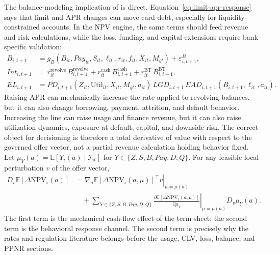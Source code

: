 \documentclass[11pt]{article}
\newcommand{\E}{\mathbb{E}}
\newcommand{\NPV}{\mathrm{NPV}}
\newcommand{\1}{\mathbf{1}}
\begin{document}
The balance-modeling implication of \citet{gross2001liquidity} is direct.
Equation~\eqref{eq:limit-apr-response} says that limit and APR changes can move
card debt, especially for liquidity-constrained accounts. In the NPV engine,
the same terms should feed revenue and risk calculations, while the loss,
funding, and capital extensions require bank-specific validation:
\begin{align}
  B_{i,t+1}
    &=
      g_B(B_{it},Pay_{it},S_{it},\ell_{it},r_{it},f_{it},
          X_{it},M_{gt}) + \varepsilon^B_{i,t+1},
      \label{eq:terms-balance}\\
  Int_{i,t+1}
    &=
      r^{\mathrm{revolve}}_{it}\,
      B^{\mathrm{revolve}}_{i,t+1}
      + r^{\mathrm{cash}}_{it}\,
      B^{\mathrm{cash}}_{i,t+1}
      + r^{\mathrm{BT}}_{it}\,
      B^{\mathrm{BT}}_{i,t+1},
      \label{eq:terms-interest}\\
  EL_{i,t+1}
    &=
      PD_{i,t+1}(Z_{it},\mathrm{Util}_{it},X_{it},M_{gt},a_{it})\,
      LGD_{i,t+1}\,
      EAD_{i,t+1}(B_{i,t+1},\ell_{it},a_{it}).
      \label{eq:terms-loss}
\end{align}
Raising APR can mechanically increase the rate applied to revolving balances,
but it can also change borrowing, payment, attrition, and default behavior.
Increasing the line can raise usage and finance revenue, but it can also raise
utilization dynamics, exposure at default, capital, and downside risk. The
correct object for decisioning is therefore a total derivative of value with
respect to the governed offer vector, not a partial revenue calculation holding
behavior fixed. Let
$\mu_Y(a)=\E[Y_i(a)\mid\mathcal{I}_{it}]$ for
$Y\in\{Z,S,B,Pay,D,Q\}$. For any feasible local perturbation $v$ of the offer
vector,
\begin{align}
  D_v\E[\Delta \NPV_i(a)]
  &=
  \left.
  \nabla_a \E[\Delta \NPV_i(a,\mu)]^\top v
  \right|_{\mu=\mu(a)}
  \nonumber\\
  &\quad
  +
  \sum_{Y\in\{Z,S,B,Pay,D,Q\}}
  \left.
  \frac{\partial \E[\Delta \NPV_i(a,\mu)]}{\partial \mu_Y}
  \right|_{\mu=\mu(a)}
  D_v\mu_Y(a).
  \label{eq:terms-total-derivative}
\end{align}
The first term is the mechanical cash-flow effect of the term sheet; the second
term is the behavioral response channel. The second term is precisely why the
rates and regulation literature belongs before the usage, CLV, loss, balance,
and PPNR sections.
\end{document}
